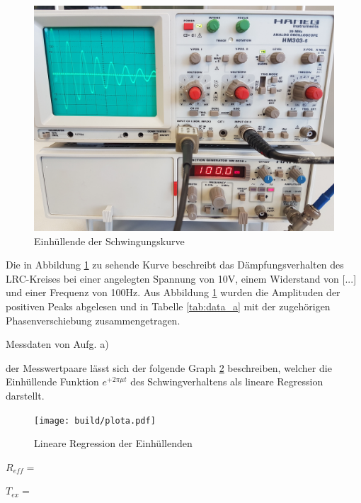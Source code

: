   \begin{figure}[H]
    \includegraphics[width=\textwidth]{images/5a.jpg}
    \centering
    \caption{Einhüllende der Schwingungskurve}
    \label{fig:5a}
  \end{figure}

  Die in Abbildung \ref{fig:5a} zu sehende Kurve beschreibt das Dämpfungsverhalten des LRC-Kreises bei einer angelegten Spannung von 
  10V, einem Widerstand von [...] und einer Frequenz von 100Hz. Aus Abbildung \ref{fig:5a} wurden die Amplituden der positiven Peaks
  abgelesen und in Tabelle \ref{tab:data_a} mit der zugehörigen Phasenverschiebung zusammengetragen.

  \begin{table}[H]
        \centering
        \caption{Messdaten von Aufg. a)}
         
        \label{tab:data_a}
  \end{table}

  \justifying der Messwertpaare lässt sich der folgende Graph \ref{fig:5ajpg} beschreiben, welcher die Einhüllende 
  Funktion $e^{+2\pi\mu t}$ des Schwingverhaltens als lineare Regression darstellt.

  \begin{figure}[H]
    \texttt{[image: build/plota.pdf]}
    \centering
    \caption{Lineare Regression der Einhüllenden}
    \label{fig:5ajpg}
  \end{figure}

  $R_{eff} =$

  $T_{ex} =\text{}$




